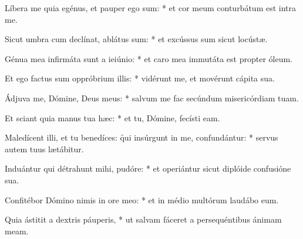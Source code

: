 \begin{psalmus}
Líbera me quia egénus, et pauper ego sum: * et cor meum conturbátum est intra me.

Sicut umbra cum declínat, ablátus sum: * et excússus sum sicut locústæ.

Génua mea infirmáta sunt a ieiúnio: * et caro mea immutáta est propter óleum.

Et ego factus sum oppróbrium illis: * vidérunt me, et movérunt cápita sua.

Ádjuva me, Dómine, Deus meus: * salvum me fac secúndum misericórdiam tuam.

Et sciant quia manus tua hæc: * et tu, Dómine, fecísti eam.

Maledícent illi, et tu benedíces: \f qui insúrgunt in me, confundántur: * servus autem tuus lætábitur.

Induántur qui détrahunt mihi, pudóre: * et operiántur sicut diplóide confusióne sua.

Confitébor Dómino nimis in ore meo: * et in médio multórum laudábo eum.

Quia ástitit a dextris páuperis, * ut salvam fáceret a persequéntibus ánimam meam.

\end{psalmus}
